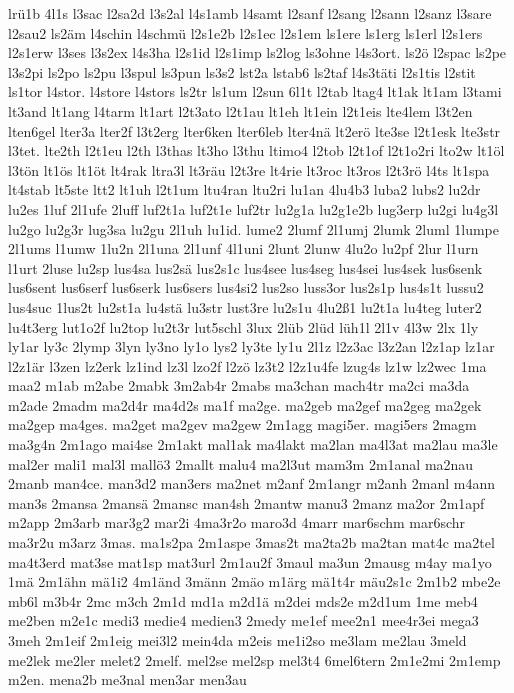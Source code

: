 {lrü1b
4l1s
l3sac
l2sa2d
l3s2al
l4s1amb
l4samt
l2sanf
l2sang
l2sann
l2sanz
l3sare
l2sau2
ls2äm
l4schin
l4schmü
l2s1e2b
l2s1ec
l2s1em
ls1ere
ls1erg
ls1erl
l2s1ers
l2s1erw
l3ses
l3s2ex
l4s3ha
l2s1id
l2s1imp
ls2log
ls3ohne
l4s3ort.
ls2ö
l2spac
ls2pe
l3s2pi
ls2po
ls2pu
l3spul
ls3pun
ls3s2
lst2a
lstab6
ls2taf
l4s3täti
l2s1tis
l2stit
ls1tor
l4stor.
l4store
l4stors
ls2tr
ls1um
l2sun
6l1t
l2tab
ltag4
lt1ak
lt1am
l3tami
lt3and
lt1ang
l4tarm
lt1art
l2t3ato
l2t1au
lt1eh
lt1ein
l2t1eis
lte4lem
l3t2en
lten6gel
lter3a
lter2f
l3t2erg
lter6ken
lter6leb
lter4nä
lt2erö
lte3se
l2t1esk
lte3str
l3tet.
lte2th
l2t1eu
l2th
l3thas
lt3ho
l3thu
ltimo4
l2tob
l2t1of
l2t1o2ri
lto2w
lt1öl
l3tön
lt1ös
lt1öt
lt4rak
ltra3l
lt3räu
l2t3re
lt4rie
lt3roc
lt3ros
l2t3rö
l4ts
lt1spa
lt4stab
lt5ste
ltt2
lt1uh
l2t1um
ltu4ran
ltu2ri
lu1an
4lu4b3
luba2
lubs2
lu2dr
lu2es
1luf
2l1ufe
2luff
luf2t1a
luf2t1e
luf2tr
lu2g1a
lu2g1e2b
lug3erp
lu2gi
lu4g3l
lu2go
lu2g3r
lug3sa
lu2gu
2l1uh
lu1id.
lume2
2lumf
2l1umj
2lumk
2luml
1lumpe
2l1ums
l1umw
1lu2n
2l1una
2l1unf
4l1uni
2lunt
2lunw
4lu2o
lu2pf
2lur
l1urn
l1urt
2luse
lu2sp
lus4sa
lus2sä
lus2s1c
lus4see
lus4seg
lus4sei
lus4sek
lus6senk
lus6sent
lus6serf
lus6serk
lus6sers
lus4si2
lus2so
luss3or
lus2s1p
lus4s1t
lussu2
lus4suc
1lus2t
lu2st1a
lu4stä
lu3str
lust3re
lu2s1u
4lu2ß1
lu2t1a
lu4teg
luter2
lu4t3erg
lut1o2f
lu2top
lu2t3r
lut5schl
3lux
2lüb
2lüd
lüh1l
2l1v
4l3w
2lx
1ly
ly1ar
ly3c
2lymp
3lyn
ly3no
ly1o
lys2
ly3te
ly1u
2l1z
l2z3ac
l3z2an
l2z1ap
lz1ar
l2z1är
l3zen
lz2erk
lz1ind
lz3l
lzo2f
l2zö
lz3t2
l2z1u4fe
lzug4s
lz1w
lz2wec
1ma
maa2
m1ab
m2abe
2mabk
3m2ab4r
2mabs
ma3chan
mach4tr
ma2ci
ma3da
m2ade
2madm
ma2d4r
ma4d2s
ma1f
ma2ge.
ma2geb
ma2gef
ma2geg
ma2gek
ma2gep
ma4ges.
ma2get
ma2gev
ma2gew
2m1agg
magi5er.
magi5ers
2magm
ma3g4n
2m1ago
mai4se
2m1akt
mal1ak
ma4lakt
ma2lan
ma4l3at
ma2lau
ma3le
mal2er
mali1
mal3l
mallö3
2mallt
malu4
ma2l3ut
mam3m
2m1anal
ma2nau
2manb
man4ce.
man3d2
man3ers
ma2net
m2anf
2m1angr
m2anh
2manl
m4ann
man3s
2mansa
2mansä
2mansc
man4sh
2mantw
manu3
2manz
ma2or
2m1apf
m2app
2m3arb
mar3g2
mar2i
4ma3r2o
maro3d
4marr
mar6schm
mar6schr
ma3r2u
m3arz
3mas.
ma1s2pa
2m1aspe
3mas2t
ma2ta2b
ma2tan
mat4c
ma2tel
ma4t3erd
mat3se
mat1sp
mat3url
2m1au2f
3maul
ma3un
2mausg
m4ay
ma1yo
1mä
2m1ähn
mä1i2
4m1änd
3männ
2mäo
m1ärg
mä1t4r
mäu2s1c
2m1b2
mbe2e
mb6l
m3b4r
2mc
m3ch
2m1d
md1a
m2d1ä
m2dei
mds2e
m2d1um
1me
meb4
me2ben
m2e1c
medi3
medie4
medien3
2medy
me1ef
mee2n1
mee4r3ei
mega3
3meh
2m1eif
2m1eig
mei3l2
mein4da
m2eis
me1i2so
me3lam
me2lau
3meld
me2lek
me2ler
melet2
2melf.
mel2se
mel2sp
mel3t4
6mel6tern
2m1e2mi
2m1emp
m2en.
mena2b
me3nal
men3ar
men3au
}
